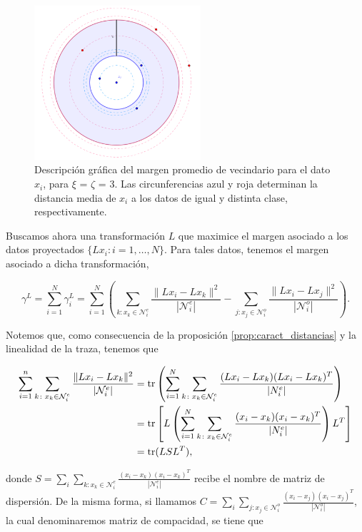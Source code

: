 \documentclass{book}
\begin{document}
\begin{figure}[h]
	\centering
	\includegraphics[width=0.55\textwidth]{./images/anmm.png}
	\caption{Descripción gráfica del margen promedio de vecindario para el dato $x_i$, para $\xi$ = $\zeta$ = 3. Las circunferencias azul y roja determinan la distancia media de $x_i$ a los datos de igual y distinta clase, respectivamente.} \label{fig:average_neighbor_margin}
\end{figure}

Buscamos ahora una transformación $L$ que maximice el margen asociado a los datos proyectados $\{Lx_i \colon i = 1,\dots,N\}$. Para tales datos, tenemos el margen asociado a dicha transformación,

\[ \gamma^L = \sum_{i=1}^{N} \gamma_i^L = \sum_{i=1}^N\left( \sum\limits_{k \colon x_k \in \mathcal{N}_i^e} \frac{\|Lx_i - Lx_k \|^2}{|\mathcal{N}_i^e|}- \sum\limits_{j \colon x_j \in \mathcal{N}_i^o} \frac{\|Lx_i - Lx_j \|^2}{|\mathcal{N}_i^o|} \right). \]

Notemos que, como consecuencia de la proposición \ref{prop:caract_distancias} y la linealidad de la traza, tenemos que


\begin{align*}
	\sum_{i=1}^n\sum\limits_{k \colon x_k \in \mathcal{N}_i^e} \frac{\|Lx_i - Lx_k \|^2}{|\mathcal{N}_i^e|} &= \operatorname{tr}\left( \sum_{i=1}^N \sum\limits_{k \colon x_k \in \mathcal{N}_i^e} \frac{(Lx_i - Lx_k)(Lx_i - Lx_k)^T}{|N_i^e|} \right) \\
	&= \operatorname{tr}\left[ L \left( \sum_{i=1}^N \sum\limits_{k \colon x_k \in \mathcal{N}_i^e} \frac{(x_i-x_k)(x_i-x_k)^T}{|N_i^e|}  \right) L^T\right]\\
	&= \operatorname{tr}(LSL^T),
\end{align*}

donde $S = \sum_{i}\sum_{k\colon x_k \in \mathcal{N}_i^e}\frac{(x_i-x_k)(x_i-x_k)^T}{|\mathcal{N}_i^e|}$ recibe el nombre de matriz de dispersión. De la misma forma, si llamamos $C = \sum_{i}\sum_{j\colon x_j \in \mathcal{N}_i^o}\frac{(x_i-x_j)(x_i-x_j)^T}{|\mathcal{N}_i^o|}$, la cual denominaremos matriz de compacidad, se tiene que
\end{document}
